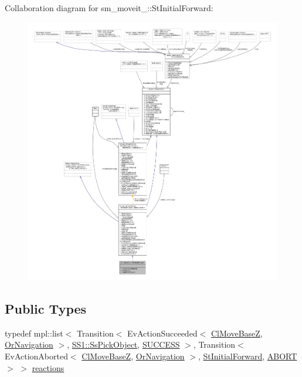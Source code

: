 Collaboration diagram for sm\+\_\+moveit\+\_\+:\+:St\+Initial\+Forward\+:
\nopagebreak
\begin{figure}[H]
\begin{center}
\leavevmode
\includegraphics[width=350pt]{structsm__moveit__4_1_1StInitialForward__coll__graph}
\end{center}
\end{figure}
\subsection*{Public Types}
\begin{DoxyCompactItemize}
\item 
typedef mpl\+::list$<$ Transition$<$ Ev\+Action\+Succeeded$<$ \hyperlink{classcl__move__base__z_1_1ClMoveBaseZ}{Cl\+Move\+BaseZ}, \hyperlink{classsm__moveit__4_1_1OrNavigation}{Or\+Navigation} $>$, \hyperlink{structsm__moveit__4_1_1SS1_1_1SsPickObject}{S\+S1\+::\+Ss\+Pick\+Object}, \hyperlink{classSUCCESS}{S\+U\+C\+C\+E\+SS} $>$, Transition$<$ Ev\+Action\+Aborted$<$ \hyperlink{classcl__move__base__z_1_1ClMoveBaseZ}{Cl\+Move\+BaseZ}, \hyperlink{classsm__moveit__4_1_1OrNavigation}{Or\+Navigation} $>$, \hyperlink{structsm__moveit__4_1_1StInitialForward}{St\+Initial\+Forward}, \hyperlink{classABORT}{A\+B\+O\+RT} $>$ $>$ \hyperlink{structsm__moveit__4_1_1StInitialForward_aa32a1bc8fc4cfa1471cf98e94aa678a6}{reactions}
\end{DoxyCompactItemize}
